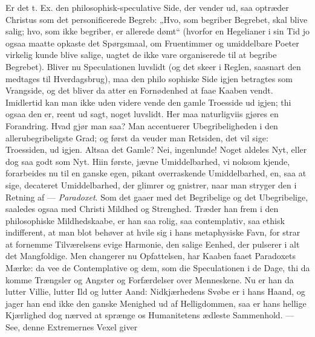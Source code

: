 \documentclass[12pt,a4paper]{book}
\begin{document}
Er det t. Ex. den philosophisk-speculative Side, der vender ud, saa optræder
Christus som det personificerede Begreb: „Hvo, som begriber Begrebet, skal blive
salig; hvo, som ikke begriber, er allerede dømt“ (hvorfor en Hegelianer i sin Tid
jo ogsaa maatte opkaste det Spørgsmaal, om Fruentimmer og umiddelbare Poeter
virkelig kunde blive salige, uagtet de ikke vare organiserede til at begribe
Begrebet). Bliver nu Speculationen luvslidt (og det skeer i Reglen, saasnart den
medtages til Hverdagsbrug), maa den philo\-%
sophiske Side igjen betragtes som Vrangside, og det bliver da atter en
Fornødenhed at faae Kaaben vendt. Imidlertid kan man ikke uden videre vende den
gamle Troesside ud igjen; thi ogsaa den er, reent ud sagt, noget luvslidt. Her
maa naturligviis gjøres en Forandring. Hvad gjør man saa? Man accentuerer
Ubegribeligheden i den allerubegribeligste Grad; og først da
veuder man Retsiden, det vil sige: Troessiden, ud igjen. Altsaa det Gamle? Nei,
ingenlunde! Noget aldeles Nyt, eller dog saa godt som Nyt. Hiin første, jævne
Umiddelbarhed, vi noksom kjende, forarbeides nu til en ganske egen, pikant
overraskende Umiddelbarhed, en, saa at sige, decateret Umiddelbarhed, der glimrer
og gnistrer, naar man stryger den i Retning af --- \emph{Paradoxet}. Som det
gaaer med det Begribelige og det Ubegribelige, saaledes ogsaa med Christi Mildhed
og Strenghed. Træder han frem i den philosophiske Mildhedskaabe, er han saa
rolig, saa contemplativ, saa ethisk indifferent, at man blot behøver at hvile sig
i hans metaphysiske Favn, for
strar at fornemme Tilværelsens evige Harmonie, den salige Eenhed, der pulserer i
alt det Mangfoldige. Men changerer nu Opfattelsen, har Kaaben faaet Paradoxets
Mærke: da vee de Contemplative og dem, som die Speculationen i de Dage, thi da
komme Trængsler og Angster og Forfærdelser over Menneskene. Nu er han da lutter
Villie, lutter Ild og lutter Aand: Nidkjærhedens Svøbe er i hans Haand, og jager
han end ikke den ganske Menighed ud af Helligdommen, saa er hans hellige
Kjærlighed dog nærved at sprænge os Humanitetens ædleste Sammenhold. --- See,
denne Extremernes Vexel giver
\end{document}
